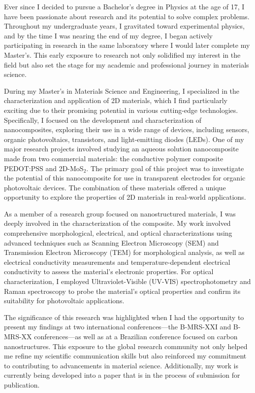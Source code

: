 \documentclass{article}
\begin{document}

Ever since I decided to pursue a Bachelor's degree in Physics at the age of 17, I have been passionate about research and its potential to solve complex problems. Throughout my undergraduate years, I gravitated toward experimental physics, and by the time I was nearing the end of my degree, I began actively participating in research in the same laboratory where I would later complete my Master's. This early exposure to research not only solidified my interest in the field but also set the stage for my academic and professional journey in materials science.

During my Master's in Materials Science and Engineering, I specialized in the characterization and application of 2D materials, which I find particularly exciting due to their promising potential in various cutting-edge technologies. Specifically, I focused on the development and characterization of nanocomposites, exploring their use in a wide range of devices, including sensors, organic photovoltaics, transistors, and light-emitting diodes (LEDs). One of my major research projects involved studying an aqueous solution nanocomposite made from two commercial materials: the conductive polymer composite PEDOT:PSS
and 2D-MoS$_2$. The primary goal of this project was to investigate the potential of this nanocomposite for use in transparent electrodes for organic photovoltaic devices. The combination of these materials offered a unique opportunity to explore the properties of 2D materials in real-world applications.

As a member of a research group focused on nanostructured materials, I was deeply involved in the characterization of the composite. My work involved comprehensive morphological, electrical, and optical characterizations using advanced techniques such as Scanning Electron Microscopy (SEM) and Transmission Electron Microscopy (TEM) for morphological analysis, as well as electrical conductivity measurements and temperature-dependent electrical conductivity to assess the material's electronic properties. For optical characterization, I employed Ultraviolet-Visible (UV-VIS) spectrophotometry and Raman spectroscopy to probe the material's optical properties and confirm its suitability for photovoltaic applications.

The significance of this research was highlighted when I had the opportunity to present my findings at two international conferences—the B-MRS-XXI and B-MRS-XX conferences—as well as at a Brazilian conference focused on carbon nanostructures. This exposure to the global research community not only helped me refine my scientific communication skills but also reinforced my commitment to contributing to advancements in material science. Additionally, my work is currently being developed into a paper that is in the process of submission for publication.
\end{document}
